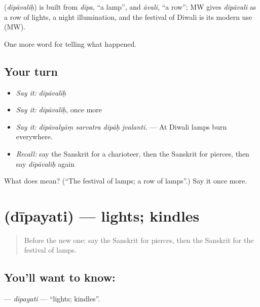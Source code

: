 \begin{cousinweb}
\textbf{} (\emph{dīpāvaliḥ}) is built from \emph{dīpa}, \textquotedblleft{}a lamp\textquotedblright{}, and \emph{āvali}, \textquotedblleft{}a row\textquotedblright{}; MW gives \emph{dīpāvali} as a row of lights, a night illumination, and the festival of Diwali is its modern use (MW).
\end{cousinweb}

\begin{grammarlens}[title={What you've built}]
One more word for telling what happened.
\end{grammarlens}

\subsection*{Your turn}
\begin{itemize}
\raggedright
  \item \emph{Say it:} \emph{dīpāvaliḥ}
  \item \emph{Say it:} \emph{dīpāvaliḥ}, once more
  \item \emph{Say it:} \emph{dīpāvalyāṃ sarvatra dīpāḥ jvalanti.} — At Diwali lamps burn everywhere.
  \item \emph{Recall:} say the Sanskrit for a charioteer, then the Sanskrit for pierces, then say \emph{dīpāvaliḥ} again
\end{itemize}

\begin{tcolorbox}[breakable,colback=teal!4,colframe=teal!35!black,title={Before you move on}]
What does  mean? (\textquotedblleft{}The festival of lamps; a row of lamps\textquotedblright{}.) Say it once more.
\end{tcolorbox}
\section[\texorpdfstring{\sk{दीपयति} (dīpayati)}{दीपयति (dīpayati)}]{ (dīpayati) — lights; kindles}

\label{lesson:SA-C326-dipayati}



\begin{quote}
Before the new one: say the Sanskrit for pierces, then the Sanskrit for the festival of lamps.
\end{quote}

\subsection*{You'll want to know: }
\textbf{} — \emph{dīpayati} — \textquotedblleft{}lights; kindles\textquotedblright{}.

